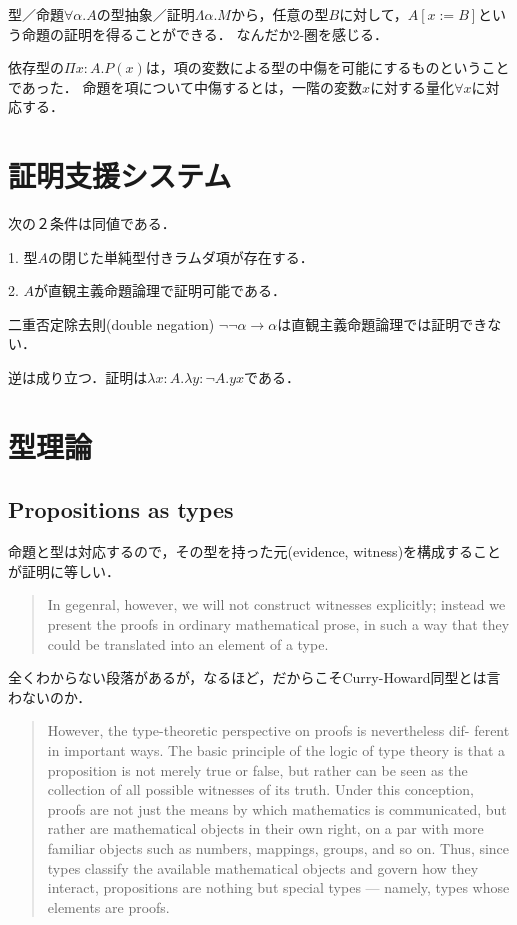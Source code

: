 \documentclass[uplatex, 12pt, dvipdfmx]{jsreport}
\begin{document}
型／命題$\forall\alpha.A$の型抽象／証明$\Lambda\alpha.M$から，任意の型$B$に対して，$A[x:=B]$という命題の証明を得ることができる．
なんだか2-圏を感じる．

依存型の$\Pi x:A.P(x)$は，項の変数による型の中傷を可能にするものということであった．
命題を項について中傷するとは，一階の変数$x$に対する量化$\forall x$に対応する．

\section{証明支援システム}

\begin{theorem}次の２条件は同値である．

    1. 型$A$の閉じた単純型付きラムダ項が存在する．

    2. $A$が直観主義命題論理で証明可能である．
\end{theorem}
\begin{corollary}
    二重否定除去則(double negation) $\lnot\lnot\alpha\to\alpha$は直観主義命題論理では証明できない．
\end{corollary}
\begin{remark}
    逆は成り立つ．証明は$\lambda x:A.\lambda y:\lnot A.yx$である．
\end{remark}

\section{型理論}

\subsection{Propositions as types}
命題と型は対応するので，その型を持った元(evidence, witness)を構成することが証明に等しい．
\begin{quote}
    In gegenral, however, we will not construct witnesses explicitly; instead we present the proofs in ordinary mathematical prose, in such a way that they could be translated into an element of a type.
\end{quote}
全くわからない段落があるが，なるほど，だからこそCurry-Howard同型とは言わないのか．
\begin{quote}
    However, the type-theoretic perspective on proofs is nevertheless dif- ferent in important ways. The basic principle of the logic of type theory is that a proposition is not merely true or false, but rather can be seen as the collection of all possible witnesses of its truth. Under this conception, proofs are not just the means by which mathematics is communicated, but rather are mathematical objects in their own right, on a par with more familiar objects such as numbers, mappings, groups, and so on. Thus, since types classify the available mathematical objects and govern how they interact, propositions are nothing but special types — namely, types whose elements are proofs.
\end{quote}
\end{document}
